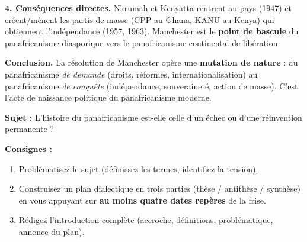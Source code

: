 \documentclass[11pt]{article}
\begin{document}
\begin{exoresolu}
\medskip
\textbf{4. Conséquences directes.}
Nkrumah et Kenyatta rentrent au pays (1947) et créent/mènent les partis de masse (CPP au Ghana, KANU au Kenya) qui obtiennent l'indépendance (1957, 1963). Manchester est le \textbf{point de bascule} du panafricanisme diasporique vers le panafricanisme continental de libération.

\medskip
\textbf{Conclusion.} La résolution de Manchester opère une \textbf{mutation de nature} : du panafricanisme \emph{de demande} (droits, réformes, internationalisation) au panafricanisme \emph{de conquête} (indépendance, souveraineté, action de masse). C'est l'acte de naissance politique du panafricanisme moderne.
\end{exoresolu}

\begin{exercice}
\textbf{Sujet :} \og L'histoire du panafricanisme est-elle celle d'un échec ou d'une réinvention permanente ? \fg

\textbf{Consignes :}
\begin{enumerate}
    \item Problématisez le sujet (définissez les termes, identifiez la tension).
    \item Construisez un plan dialectique en trois parties (thèse / antithèse / synthèse) en vous appuyant sur \textbf{au moins quatre dates repères} de la frise.
    \item Rédigez l'introduction complète (accroche, définitions, problématique, annonce du plan).
\end{enumerate}
\end{exercice}
\end{document}
